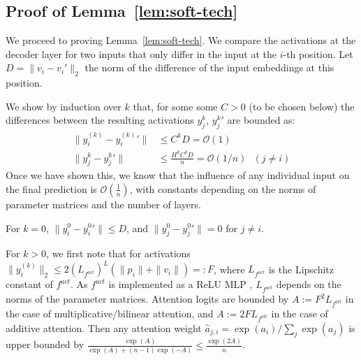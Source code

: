 \documentclass[11pt,a4paper]{article}
\begin{document}
\subsection{Proof of Lemma~\ref{lem:soft-tech}}
We proceed to proving Lemma~\ref{lem:soft-tech}.
We compare the activations at the decoder layer for two inputs that only differ in the input at the $i$-th position.
Let $D = \|v_i-v_i'\|_2$ the norm of the difference of the input embeddings at this position.

	We show by induction over $k$ that, for some some $C > 0$ (to be chosen below) the differences between the resulting activations $y_j^k$, ${y_j^k}'$ are bounded as:
\begin{align*}
	\|y_i^{(k)}-{y_i^{(k)}}'\| &\leq C^{k}D = \mathcal{O}(1) \\
	\|y_j^k-{y_j^k}'\| &\leq \frac{H^k C^{k}D}{n} = \mathcal{O}(1/n)\ \ \ (j \neq i)
	\end{align*}
Once we have shown this, we know that the influence of any individual input on the final prediction is $\mathcal{O}(\frac{1}{n})$, with constants depending on the norms of parameter matrices and the number of layers.


For $k=0$, $\|y_i^0 - {y_i^0}'\| \leq D$, %
and %
$\|y_j^0 - {y_j^0}'\| = 0$ for $j \neq i$.

For $k>0$, we first note that for activations $\|y_i^{(k)}\|_2 \leq 2 \left(L_{f^{act}}\right)^{L}  (\|p_i\| + \|v_i\|) =: F$, where
$L_{f^{act}}$ is the Lipschitz constant of $f^{act}$.
As $f^{act}$ is implemented as a ReLU MLP \cite{vaswani2017attention}, $L_{f^{act}}$ depends on the norms of the parameter matrices.
Attention logits are bounded by $A := F^2 L_{f^{att}}$ in the case of multiplicative/bilinear attention, and $A := 2 F L_{f^{att}}$ in the case of additive attention.
Then any attention weight $\widehat{a}_{j,i} = \exp(a_i)/\sum_j \exp(a_j)$ is upper bounded by $\frac{\exp(A)}{\exp(A) + (n-1) \exp(-A)} \leq \frac{\exp(2A)}{n}$.
\end{document}
